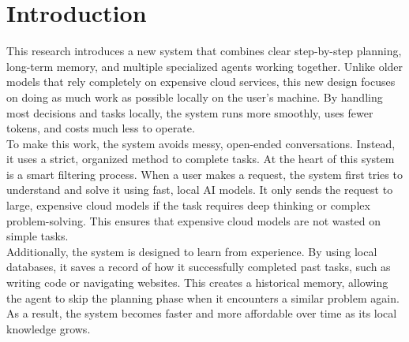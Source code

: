 \section{Introduction}
This research introduces a new system that combines clear step-by-step planning, long-term memory, and multiple specialized agents working together. Unlike older models that rely completely on expensive cloud services, this new design focuses on doing as much work as possible locally on the user's machine. By handling most decisions and tasks locally, the system runs more smoothly, uses fewer tokens, and costs much less to operate.\\

To make this work, the system avoids messy, open-ended conversations. Instead, it uses a strict, organized method to complete tasks. At the heart of this system is a smart filtering process. When a user makes a request, the system first tries to understand and solve it using fast, local AI models. It only sends the request to large, expensive cloud models if the task requires deep thinking or complex problem-solving. This ensures that expensive cloud models are not wasted on simple tasks.\\

Additionally, the system is designed to learn from experience. By using local databases, it saves a record of how it successfully completed past tasks, such as writing code or navigating websites. This creates a historical memory, allowing the agent to skip the planning phase when it encounters a similar problem again. As a result, the system becomes faster and more affordable over time as its local knowledge grows.\\

